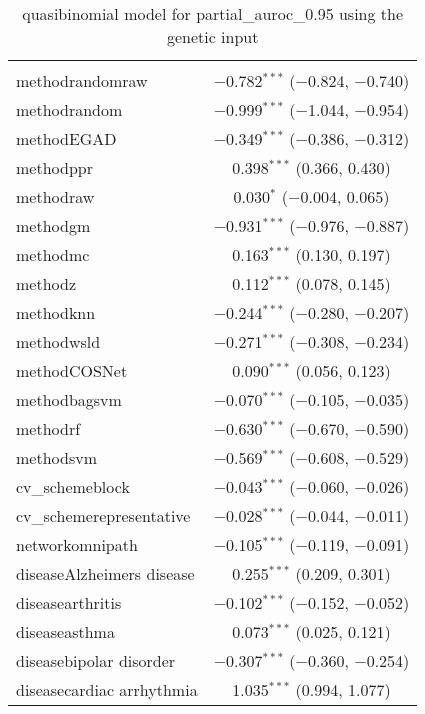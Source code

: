 
\begin{table}[!htbp] \centering 
  \caption{quasibinomial model for partial_auroc_0.95 using the genetic input} 
  \label{} 
\begin{tabular}{@{\extracolsep{5pt}}lc} 
\\[-1.8ex]\hline 
\hline \\[-1.8ex] 
 methodrandomraw & $-$0.782$^{***}$ ($-$0.824, $-$0.740) \\ 
  methodrandom & $-$0.999$^{***}$ ($-$1.044, $-$0.954) \\ 
  methodEGAD & $-$0.349$^{***}$ ($-$0.386, $-$0.312) \\ 
  methodppr & 0.398$^{***}$ (0.366, 0.430) \\ 
  methodraw & 0.030$^{*}$ ($-$0.004, 0.065) \\ 
  methodgm & $-$0.931$^{***}$ ($-$0.976, $-$0.887) \\ 
  methodmc & 0.163$^{***}$ (0.130, 0.197) \\ 
  methodz & 0.112$^{***}$ (0.078, 0.145) \\ 
  methodknn & $-$0.244$^{***}$ ($-$0.280, $-$0.207) \\ 
  methodwsld & $-$0.271$^{***}$ ($-$0.308, $-$0.234) \\ 
  methodCOSNet & 0.090$^{***}$ (0.056, 0.123) \\ 
  methodbagsvm & $-$0.070$^{***}$ ($-$0.105, $-$0.035) \\ 
  methodrf & $-$0.630$^{***}$ ($-$0.670, $-$0.590) \\ 
  methodsvm & $-$0.569$^{***}$ ($-$0.608, $-$0.529) \\ 
  cv\_schemeblock & $-$0.043$^{***}$ ($-$0.060, $-$0.026) \\ 
  cv\_schemerepresentative & $-$0.028$^{***}$ ($-$0.044, $-$0.011) \\ 
  networkomnipath & $-$0.105$^{***}$ ($-$0.119, $-$0.091) \\ 
  diseaseAlzheimers disease & 0.255$^{***}$ (0.209, 0.301) \\ 
  diseasearthritis & $-$0.102$^{***}$ ($-$0.152, $-$0.052) \\ 
  diseaseasthma & 0.073$^{***}$ (0.025, 0.121) \\ 
  diseasebipolar disorder & $-$0.307$^{***}$ ($-$0.360, $-$0.254) \\ 
  diseasecardiac arrhythmia & 1.035$^{***}$ (0.994, 1.077) \\ 

\end{tabular}
\end{table}
